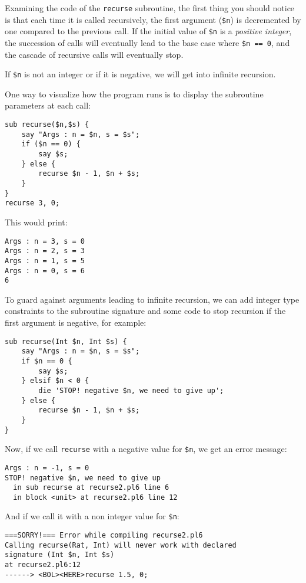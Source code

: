 Examining the code of the {\tt recurse} subroutine, the 
first thing you should notice is that each time it 
is called recursively, the first argument (\verb'$n') is 
decremented by one compared to the previous call. If the 
initial value of \verb'$n' is a \emph{positive integer}, the 
succession of calls will eventually lead to the base case 
where \verb'$n == 0', and the cascade of recursive calls 
will eventually stop. 

If \verb'$n' is not an integer or if it is negative, we will get 
into infinite recursion.

One way to visualize how the program runs is to display 
the subroutine parameters at each call:

\begin{verbatim}
sub recurse($n,$s) {
    say "Args : n = $n, s = $s";
    if ($n == 0) {
        say $s;
    } else {
        recurse $n - 1, $n + $s;
    }
}
recurse 3, 0;
\end{verbatim}
This would print:
\begin{verbatim}
Args : n = 3, s = 0
Args : n = 2, s = 3
Args : n = 1, s = 5
Args : n = 0, s = 6
6
\end{verbatim}

To guard against arguments leading to infinite recursion, 
we can add integer type constraints to the subroutine 
signature and some code to stop recursion if the first 
argument is negative, for example:

\begin{verbatim}
sub recurse(Int $n, Int $s) {
    say "Args : n = $n, s = $s";
    if $n == 0 {
        say $s;
    } elsif $n < 0 {
        die 'STOP! negative $n, we need to give up';
    } else {
        recurse $n - 1, $n + $s;
    }
}
\end{verbatim}
%

Now, if we call {\tt recurse} with a negative value for 
\verb'$n', we get an error message:

\begin{verbatim}
Args : n = -1, s = 0
STOP! negative $n, we need to give up
  in sub recurse at recurse2.pl6 line 6
  in block <unit> at recurse2.pl6 line 12
\end{verbatim}
%

And if we call it with a non integer value for \verb'$n':

\begin{verbatim}
===SORRY!=== Error while compiling recurse2.pl6
Calling recurse(Rat, Int) will never work with declared
signature (Int $n, Int $s)
at recurse2.pl6:12
------> <BOL><HERE>recurse 1.5, 0;
\end{verbatim}
%

